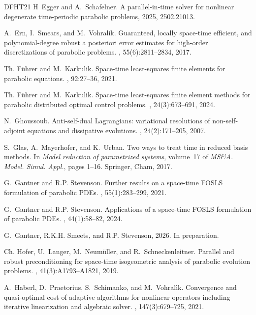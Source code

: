 \documentclass{amsart}
\numberwithin{equation}{section}
\newcommand{\1}{\mathbb 1}
\newcommand{\uumlaut}{{\"u}}
\begin{document}
\begin{thebibliography}{DFHT21}
H~Egger and A.~Schafelner.
\newblock A parallel-in-time solver for nonlinear degenerate time-periodic
  parabolic problems, 2025, 2502.21013.

A.~Ern, I.~Smears, and M.~Vohral\'{i}k.
\newblock Guaranteed, locally space-time efficient, and polynomial-degree
  robust a posteriori error estimates for high-order discretizations of
  parabolic problems.
, 55(6):2811--2834, 2017.

Th. F{\uumlaut}hrer and M.~Karkulik.
\newblock Space-time least-squares finite elements for parabolic equations.
, 92:27--36, 2021.

Th. F\"{u}hrer and M.~Karkulik.
\newblock Space-time least-squares finite element methods for parabolic
  distributed optimal control problems.
, 24(3):673--691, 2024.

N.~Ghoussoub.
\newblock Anti-self-dual {L}agrangians: variational resolutions of
  non-self-adjoint equations and dissipative evolutions.
,
  24(2):171--205, 2007.

S.~Glas, A.~Mayerhofer, and K.~Urban.
\newblock Two ways to treat time in reduced basis methods.
\newblock In {\em Model reduction of parametrized systems}, volume~17 of {\em
  MS\&A. Model. Simul. Appl.}, pages 1--16. Springer, Cham, 2017.

G.~Gantner and R.P. Stevenson.
\newblock Further results on a space-time {FOSLS} formulation of parabolic
  {PDE}s.
, 55(1):283--299, 2021.

G.~Gantner and R.P. Stevenson.
\newblock Applications of a space-time {FOSLS} formulation of parabolic {PDEs}.
, 44(1):58--82, 2024.

G.~Gantner, R.K.H. Smeets, and R.P. Stevenson, 2026.
\newblock In preparation.

Ch. Hofer, U.~Langer, M.~Neum\"{u}ller, and R.~Schneckenleitner.
\newblock Parallel and robust preconditioning for space-time isogeometric
  analysis of parabolic evolution problems.
, 41(3):A1793--A1821, 2019.

A.~Haberl, D.~Praetorius, S.~Schimanko, and M.~Vohral\'{\i}k.
\newblock Convergence and quasi-optimal cost of adaptive algorithms for
  nonlinear operators including iterative linearization and algebraic solver.
, 147(3):679--725, 2021.


\end{thebibliography}
\end{document}
